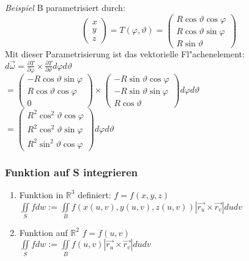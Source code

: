 \documentclass[10pt, a4paper, twocolumn]{scrartcl}
\begin{document}
\textit{Beispiel} B parametrisiert durch:
$$\left (
\begin{array}{c}
 x\\
 y\\
 z
\end{array}
\right )=T(\varphi,\vartheta)=
\left(
\begin{array}{c}
 R\cos\vartheta\cos\varphi\\
 R\cos\vartheta\sin\varphi\\
 R\sin\vartheta
\end{array}
\right)
$$
Mit dieser Parametrisierung ist das vektorielle Fl"achenelement:\\
$d\vec{\omega}=\frac{\partial T}{\partial \varphi}\times\frac{\partial T}{\partial \vartheta}d\varphi d\vartheta$\\
$=\left(
\begin{array}{c}
 -R\cos\vartheta\sin\varphi\\
 R\cos\vartheta\cos\varphi\\
 0
\end{array}
\right)\times
\left(
\begin{array}{c}
 -R\sin\vartheta\cos\varphi\\
 -R\sin\vartheta\sin\varphi\\
 R\cos\vartheta
\end{array}
\right) d\varphi d\vartheta$\\
$=\left (
\begin{array}{c}
 R^2\cos^2\vartheta\cos\varphi\\
 R^2\cos^2\vartheta\sin\varphi\\
 R^2\sin^2\vartheta\cos\varphi
\end{array}
\right )d\varphi d\vartheta$

\subsubsection{Funktion auf S integrieren}

\begin{enumerate}
 \item Funktion in $\mathbb{R}^3$ definiert: $f=f(x,y,z)$\\
  $\iint\limits_S f dw:=\iint\limits_B f(x(u,v),y(u,v),z(u,v))|\vec{r_u}\times\vec{r_v}|dudv$
 \item Funktion auf $\mathbb{R}^2$ $f=f(u,v)$\\
  $\iint\limits_S f dw:=\iint\limits_B f(u,v)|\vec{r_u}\times\vec{r_v}|dudv$
\end{enumerate}
\end{document}
